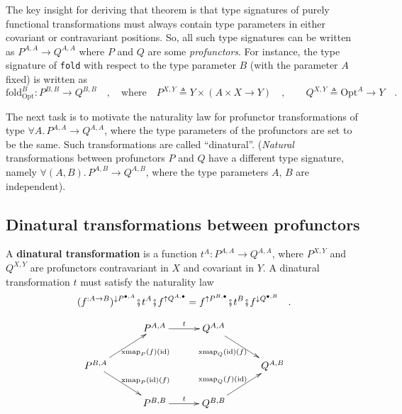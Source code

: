 The key insight for deriving that theorem is that type signatures
of purely functional transformations must always contain type parameters
in either covariant or contravariant positions. So, all such type
signatures can be written as $P^{A,A}\rightarrow Q^{A,A}$ where $P$
and $Q$ are some \emph{profunctors}. For instance, the type signature
of \lstinline!fold! with respect to the type parameter $B$ (with
the parameter $A$ fixed) is written as
\begin{equation}
\text{fold}_{\text{Opt}}^{B}:P^{B,B}\rightarrow Q^{B,B}\quad,\quad\text{where}\quad P^{X,Y}\triangleq Y\times\left(A\times X\rightarrow Y\right)\quad,\quad\quad Q^{X,Y}\triangleq\text{Opt}^{A}\rightarrow Y\quad.\label{eq:fold-type-signature-via-profunctors-derivation1}
\end{equation}

The next task is to motivate the naturality law for profunctor transformations
of type $\forall A.\,P^{A,A}\rightarrow Q^{A,A}$, where the type
parameters of the profunctors are set to be the same. Such transformations
are called ``dinatural''. (\emph{Natural} transformations between
profunctors $P$ and $Q$ have a different type signature, namely
$\forall(A,B).\,P^{A,B}\rightarrow Q^{A,B}$, where the type parameters
$A$, $B$ are independent).

\subsection{Dinatural transformations between profunctors}

A \textbf{dinatural transformation}
is a function $t^{A}:P^{A,A}\rightarrow Q^{A,A}$, where $P^{X,Y}$
and $Q^{X,Y}$ are profunctors contravariant in $X$ and covariant
in $Y$. A dinatural transformation $t$ must satisfy the naturality
law
\begin{equation}
(f^{:A\rightarrow B})^{\downarrow P^{\bullet,A}}\bef t^{A}\bef f^{\uparrow Q^{A,\bullet}}=f^{\uparrow P^{B,\bullet}}\bef t^{B}\bef f^{\downarrow Q^{\bullet,B}}\quad.\label{eq:naturality-law-for-dinatural-transformations-of-profunctors}
\end{equation}

\begin{wrapfigure}{l}{0.43\columnwidth}%
\vspace{-2\baselineskip}
\[
\xymatrix{\xyScaleY{1.8pc}\xyScaleX{2.5pc} & P^{A,A}\ar[r]\sp(0.5){t} & Q^{A,A}\ar[rd]\sb(0.45){\text{xmap}_{Q}(\text{id})(f)}\\
P^{B,A}\ar[rd]\sp(0.55){\text{xmap}_{P}(\text{id})(f)}\ar[ru]\sb(0.55){\text{xmap}_{P}(f)(\text{id})} &  &  & Q^{A,B}\\
 & P^{B,B}\ar[r]\sp(0.5){t} & Q^{B,B}\ar[ru]\sp(0.45){\text{xmap}_{Q}(f)(\text{id})}
}
\]

\vspace{-0.7\baselineskip}
\end{wrapfigure}%

